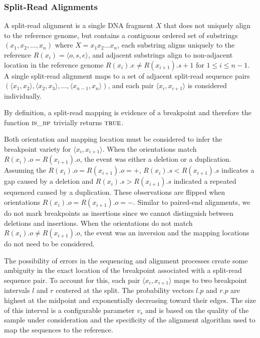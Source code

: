 \documentclass[10pt]{bmc_article}
\newenvironment{bmcformat}{\begin{raggedright}\baselineskip20pt\sloppy\setboolean{publ}{false}}{\end{raggedright}\baselineskip20pt\sloppy}
\begin{document}
\begin{bmcformat}
\subsubsection*{Split-Read Alignments}

A split-read alignment is a single DNA fragment $X$ that does not uniquely align
to the reference genome, but contains a contiguous ordered set of substrings
$(x_1, x_2, \dots, x_n)$ where $X=x_1x_2\dots x_n$, each substring aligns
uniquely to the reference $R(x_i)=\langle o,s,e \rangle$, and adjacent
substrings align to non-adjacent location in the reference genome
$R(x_{i}).e \neq R(x_{i+1}).s + 1$ for $1\leq i \leq n-1$. A single split-read
alignment maps to a set of adjacent split-read sequence pairs
$(\langle x_1 , x_2 \rangle, \langle x_2, x_3 \rangle, \dots ,
\langle x_{n-1},x_n \rangle)$, and each pair $\langle x_i,x_{i+1} \rangle$ is
considered individually.

By definition, a split-read mapping is evidence of a breakpoint and therefore
the function $\textsc{is\_bp}$ trivially returns $\textsc{true}$.

Both orientation and mapping location must be considered to infer the breakpoint
variety for $\langle x_i,x_{i+1} \rangle$.  When the orientations match
$R(x_{i}).o=R(x_{i+1}).o$, the event was either a deletion or
a duplication.  Assuming the $R(x_{i}).o=R(x_{i+1}).o=+$,
$R(x_{i}).s<R(x_{i+1}).s$ indicates a gap caused by a deletion and
$R(x_{i}).s>R(x_{i+1}).s$ indicated a repeated sequenced caused by a
duplication.   These observations are flipped when orientations
$R(x_{i}).o=R(x_{i+1}).o=-$.  Similar to paired-end alignments, we do not mark
breakpoints as insertions since we cannot distinguish between deletions
and insertions.  When the orientations do not match $R(x_{i}).o \ne
R(x_{i+1}).o$, the event was an inversion and the mapping locations do not need
to be considered.

The possibility of errors in the sequencing and alignment processes create some
ambiguity in the exact location of the breakpoint associated with a split-read
sequence pair.  To account for this, each pair $\langle x_i, x_{i+1} \rangle$
maps to two breakpoint intervals $l$ and $r$ centered at the split. The
probability vectors $l.p$ and $r.p$ are highest at the midpoint and
exponentially decreasing toward their edges.  The size of this interval is a
configurable parameter $v_s$ and is based on the quality of the sample under
consideration and the specificity of the alignment algorithm used to map the
sequences to the reference.


\end{bmcformat}
\end{document}
